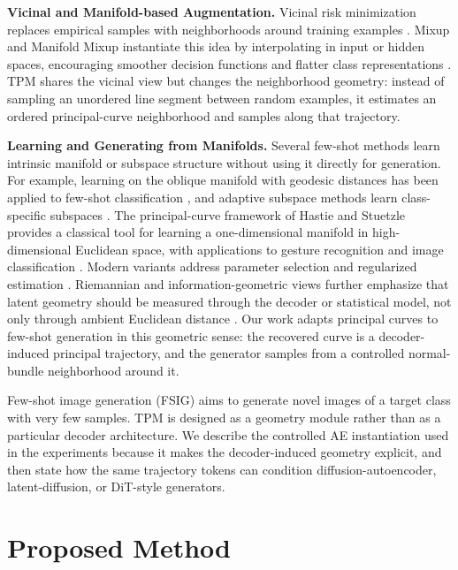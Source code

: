 \documentclass{article}
\begin{document}
\textbf{Vicinal and Manifold-based Augmentation.} Vicinal risk minimization replaces empirical samples with neighborhoods around training examples \citep{chapelle2000vicinal}. Mixup and Manifold Mixup instantiate this idea by interpolating in input or hidden spaces, encouraging smoother decision functions and flatter class representations \citep{zhang2018mixup, verma2019manifoldmixup}. TPM shares the vicinal view but changes the neighborhood geometry: instead of sampling an unordered line segment between random examples, it estimates an ordered principal-curve neighborhood and samples along that trajectory.

\textbf{Learning and Generating from Manifolds.} Several few-shot methods learn intrinsic manifold or subspace structure without using it directly for generation. For example, learning on the oblique manifold with geodesic distances has been applied to few-shot classification \citep{qi2021transductive}, and adaptive subspace methods learn class-specific subspaces \citep{simon2020adaptive}. The principal-curve framework of Hastie and Stuetzle \citep{hastie1989principal} provides a classical tool for learning a one-dimensional manifold in high-dimensional Euclidean space, with applications to gesture recognition \citep{bobick1997state, chun2003markerless} and image classification \citep{chang1998principal}. Modern variants address parameter selection and regularized estimation \citep{gerber2013regularization, biau2011parameter}. Riemannian and information-geometric views further emphasize that latent geometry should be measured through the decoder or statistical model, not only through ambient Euclidean distance \citep{amari1998natural, hauberg2015principal}. Our work adapts principal curves to few-shot generation in this geometric sense: the recovered curve is a decoder-induced principal trajectory, and the generator samples from a controlled normal-bundle neighborhood around it.

Few-shot image generation (FSIG) aims to generate novel images of a target class with very few samples. TPM is designed as a geometry module rather than as a particular decoder architecture. We describe the controlled AE instantiation used in the experiments because it makes the decoder-induced geometry explicit, and then state how the same trajectory tokens can condition diffusion-autoencoder, latent-diffusion, or DiT-style generators.

\section{Proposed Method}
\end{document}
